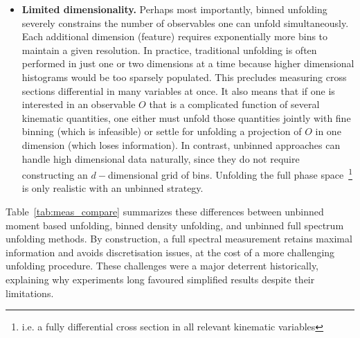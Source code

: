 \begin{itemize}
            Additionally, binning can bias downstream analysis;
            for instance, extracting moments from a binned distribution requires assuming a shape within each bin~\footnote{often a constant or linear interpolation}.
            If the true distribution varies non--linearly inside the bin, the extracted moment is biased by the bin size and shape assumption such that even the sign of the error cannot be known \textit{a priori}~\cite{desai2024moment}.
            An unbinned measurement eliminates this intermediate step and the bias that can arise from it.
        \item \textbf{Limited dimensionality.}
            Perhaps most importantly, binned unfolding severely constrains the number of observables one can unfold simultaneously.
            Each additional dimension (feature) requires exponentially more bins to maintain a given resolution.
            In practice, traditional unfolding is often performed in just one or two dimensions at a time because higher dimensional histograms would be too sparsely populated.
            This precludes measuring cross sections differential in many variables at once.
            It also means that if one is interested in an observable $O$ that is a complicated function of several kinematic quantities, one either must unfold those quantities jointly with fine binning (which is infeasible) or settle for unfolding a projection of $O$ in one dimension (which loses information).
            In contrast, unbinned approaches can handle high dimensional data naturally, since they do not require constructing an \(d-\)dimensional grid of bins.
            Unfolding the full phase space~\footnote{i.e. a fully differential cross section in all relevant kinematic variables} is only realistic with an unbinned strategy.
    \end{itemize}        



    Table~\ref{tab:meas_compare} summarizes these differences between unbinned moment based unfolding, binned density unfolding, and unbinned full spectrum unfolding methods.
    By construction, a full spectral measurement retains maximal information and avoids discretisation issues, at the cost of a more challenging unfolding procedure.
    These challenges were a major deterrent historically, explaining why experiments long favoured simplified results despite their limitations.
    
